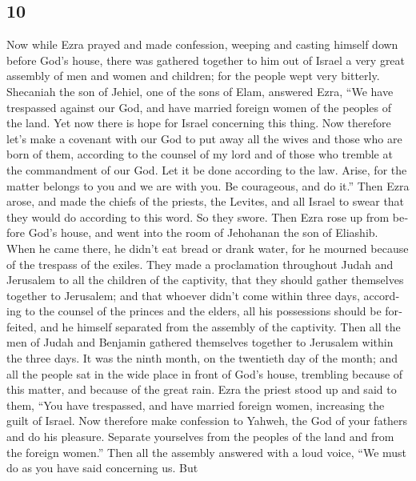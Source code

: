 \begin{paracol}{2}
\begin{otherlanguage}{english}
\hypertarget{section-19}{%
\section{10}\label{section-19}}

 Now while Ezra prayed and made confession, weeping and
casting himself down before God's house, there was gathered together to
him out of Israel a very great assembly of men and women and children;
for the people wept very bitterly.  Shecaniah the son of
Jehiel, one of the sons of Elam, answered Ezra, ``We have trespassed
against our God, and have married foreign women of the peoples of the
land. Yet now there is hope for Israel concerning this thing.
 Now therefore let's make a covenant with our God to put
away all the wives and those who are born of them, according to the
counsel of my lord and of those who tremble at the commandment of our
God. Let it be done according to the law.  Arise, for the
matter belongs to you and we are with you. Be courageous, and do it.''
 Then Ezra arose, and made the chiefs of the priests, the
Levites, and all Israel to swear that they would do according to this
word. So they swore.  Then Ezra rose up from before God's
house, and went into the room of Jehohanan the son of Eliashib. When he
came there, he didn't eat bread or drank water, for he mourned because
of the trespass of the exiles.  They made a proclamation
throughout Judah and Jerusalem to all the children of the captivity,
that they should gather themselves together to Jerusalem; 
and that whoever didn't come within three days, according to the counsel
of the princes and the elders, all his possessions should be forfeited,
and he himself separated from the assembly of the captivity.
 Then all the men of Judah and Benjamin gathered
themselves together to Jerusalem within the three days. It was the ninth
month, on the twentieth day of the month; and all the people sat in the
wide place in front of God's house, trembling because of this matter,
and because of the great rain.  Ezra the priest stood up
and said to them, ``You have trespassed, and have married foreign women,
increasing the guilt of Israel.  Now therefore make
confession to Yahweh, the God of your fathers and do his pleasure.
Separate yourselves from the peoples of the land and from the foreign
women.''  Then all the assembly answered with a loud
voice, ``We must do as you have said concerning us.  But

\end{otherlanguage}
\end{paracol}
